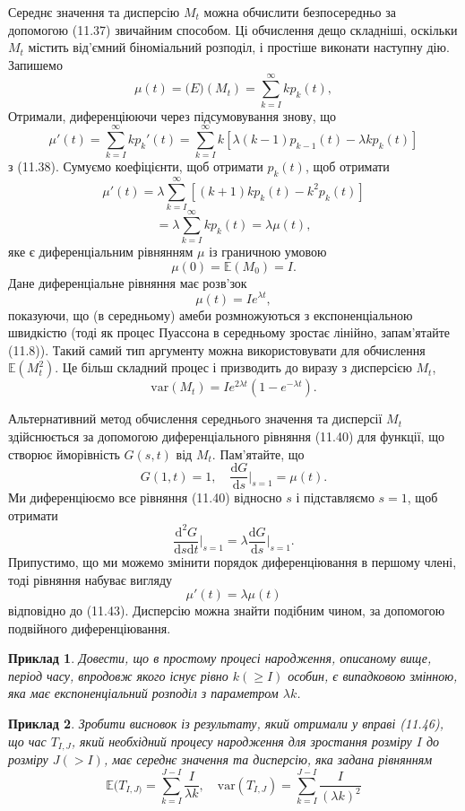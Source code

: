 \documentclass[12pt,fleqn]{article}
\newtheorem{example}{Приклад}[section]
\numberwithin{figure}{section}
\numberwithin{equation}{section}
\begin{document}
Середнє значення та дисперсію $M_t$ можна обчислити безпосередньо за допомогою (11.37) звичайним способом. Ці обчислення дещо складніші, оскільки $M_t$ містить від'ємний біноміальний розподіл, і простіше виконати наступну дію. Запишемо
$$\mu(t)=\mathbb(E)(M_t)=\sum_{k=I}^{\infty}kp_k(t),$$
Отримали, диференціюючи через підсумовування знову, що
\begin{equation}\label{11.41}
  \mu'(t)=\sum_{k=I}^{\infty}kp_k'(t)=\sum_{k=I}^{\infty}k\left[\lambda(k-1)p_{k-1}(t)-\lambda k p_k(t) \right]
\end{equation}
з (11.38). Сумуємо коефіцієнти, щоб отримати $p_k(t)$, щоб отримати
\begin{equation}\label{11.42}
  \mu'(t)=\lambda\sum_{k=I}^{\infty}\left[(k+1)kp_{k}(t)-k^2p_k(t) \right]
\end{equation}
\begin{equation}\label{11.43}
  = \lambda \sum_{k=I}^{\infty} kp_k(t)=\lambda\mu(t),
\end{equation}
яке є диференціальним рівнянням $\mu$ із граничною умовою
$$\mu(0)=\mathbb{E}(M_0)=I.$$
Дане диференціальне рівняння має розв'зок
$$\mu(t)=Ie^{\lambda t},$$
показуючи, що (в середньому) амеби розмножуються з експоненціальною швидкістю (тоді як процес Пуассона в середньому зростає лінійно, запам'ятайте (11.8)). Такий самий тип аргументу можна використовувати для обчислення $\mathbb{E}(M_{t}^{2})$. Це більш складний процес і призводить до виразу з дисперсією $M_t$,
\begin{equation}\label{11.44}
  \text{var}(M_t)=Ie^{2\lambda t}(1-e^{-\lambda t}).
\end{equation}

Альтернативний метод обчислення середнього значення та дисперсії $M_t$ здійснюється за допомогою диференціального рівняння (11.40) для функції, що створює йморівність $G(s,t)$ від $M_t$. Пам'ятайте, що
$$G(1,t)=1, \quad \frac{\mathrm{d}G}{\mathrm{d}s}\bigg|_{s=1}=\mu(t). $$
Ми диференціюємо все рівняння (11.40) відносно $s$ і підставляємо $s=1$,  щоб отримати
$$\frac{\mathrm{d}^2G}{\mathrm{d}s\mathrm{d}t}\bigg|_{s=1}=\lambda\frac{\mathrm{d}G}{\mathrm{d}s}\bigg|_{s=1}.$$
Припустимо, що ми можемо змінити порядок диференціювання в першому члені, тоді рівняння набуває вигляду 
$$\mu'(t)=\lambda\mu(t)$$
відповідно до (11.43). Дисперсію можна знайти подібним чином, за допомогою подвійного диференціювання.

\begin{example}\label{11.46}
  Довести, що в простому процесі народження, описаному вище, період часу, впродовж якого існує рівно $k(\geq I)$ особин, є випадковою змінною, яка має експоненціальний розподіл з параметром $\lambda k$.
\end{example}

\begin{example}\label{11.47}
  Зробити висновок із результату, який отримали у вправі (11.46), що час $T_{I,J}$, який необхідний процесу народження для зростання розміру $I$ до розміру $J (>I)$, має середнє значення та дисперсію, яка задана рівнянням
  $$\mathbb{E}(T_{I,J)}=\sum_{k=I}^{J-I}\frac{I}{\lambda k}, \quad \text{var}(T_{I,J})=\sum_{k=I}^{J-I}\frac{I}{(\lambda k)^2}$$
\end{example}
\end{document}

